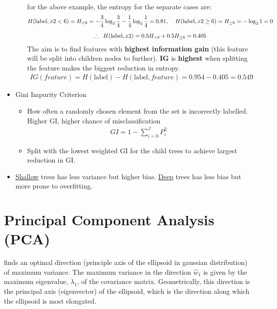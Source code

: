 \documentclass[a4paper,10pt]{article}
\begin{document}
\begin{itemize}
\begin{itemize}
\begin{gather*}
            \end{gather*}
            for the above example, the entropy for the separate cases are:
            \begin{gather*}
                H(\text{label},x2<6) = H_{<6} = -\frac{3}{4}\log_2\frac{3}{4}-\frac{1}{4}\log_2\frac{1}{4}=0.81,\hspace*{0.4cm}H(\text{label},x2\geq6) = H_{\geq6} = -\log_21 = 0\\[0.2cm]
                \therefore\hspace*{0.2cm}H(\text{label},x2) = 0.5H_{<6}+0.5H_{\geq6} = 0.405
            \end{gather*}
            The aim is to find features with \textbf{highest information gain} (this feature will be split into children nodes to further). \textbf{IG} is \textbf{highest} when splitting the feature makes the biggest reduction in entropy.
            \begin{gather*}
                IG(feature) = H(\text{label}) - H(\text{label}, feature) = 0.954-0.405 = 0.549
            \end{gather*}
        \end{itemize}
        \vspace*{-0.4cm}
    \item Gini Impurity Criterion
        \begin{itemize}
            \item How often a randomly chosen element from the set is incorrectly labelled. Higher GI, higher chance of misclassification
            \begin{gather*}
                GI = 1-\sum_{i=0}^{J}P_i^2
            \end{gather*}
            \vspace*{-0.4cm}
            \item Split with the lowest weighted GI for the child trees to achieve largest reduction in GI.
        \end{itemize}
    \item \underline{Shallow} trees has less variance but higher bias. \underline{Deep} trees has less bias but more prone to overfitting. 
\end{itemize}

\section{Principal Component Analysis (PCA)}
finds an optimal direction (principle axis of the ellipsoid in gaussian distribution) of maximum variance. The maximum variance in the direction $\hat{w}_1$ is given by the maximum eigenvalue, $\lambda_1$, of the covariance matrix. Geometrically, this direction is the principal axis (eigenvector) of the ellipsoid, which is the direction along which the ellipsoid is most elongated.\par 
\end{document}
